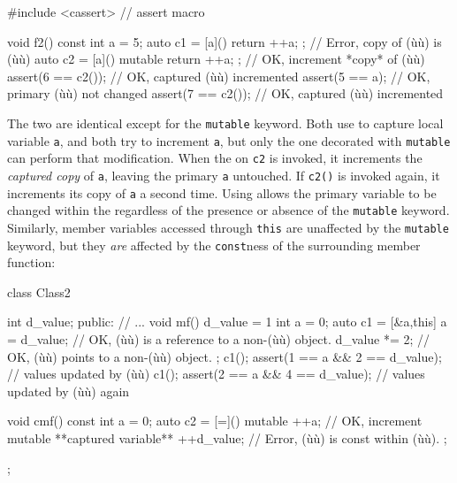 \begin{emcppslisting}
#include <cassert> // assert macro

void f2()
{
    const int a = 5;
    auto c1 = [a]()         { return ++a; };  // Error, copy of (ù{}ù) is (ù{}ù)
    auto c2 = [a]() mutable { return ++a; };  // OK, increment *copy* of (ù{}ù)
    assert(6 == c2());                        // OK, captured (ù{}ù) incremented
    assert(5 == a);                           // OK, primary (ù{}ù) not changed
    assert(7 == c2());                        // OK, captured (ù{}ù) incremented
}
\end{emcppslisting}
    

The two  are identical except for the
\lstinline!mutable! keyword. Both use  to capture
local variable \lstinline!a!, and both try to increment \lstinline!a!, but
only the one decorated with \lstinline!mutable! can perform that
modification. When the  on 
\lstinline!c2! is invoked, it increments the \emph{captured copy} of
\lstinline!a!, leaving the primary \lstinline!a! untouched. If \lstinline!c2()!
is invoked again, it increments its copy of \lstinline!a! a second time.
Using  allows the primary variable to be
changed within the  regardless of the presence or
absence of the \lstinline!mutable! keyword. Similarly, member variables
accessed through \lstinline!this! are unaffected by the \lstinline!mutable!
keyword, but they \emph{are} affected by the \lstinline!const!ness of the
surrounding member function:

\begin{emcppslisting}
class Class2
{
    int d_value;
public:
    // ...
    void mf()
    {
        d_value = 1
        int a = 0;
        auto c1 = [&a,this]{
            a = d_value;   // OK, (ù{}ù) is a reference to a non-(ù{}ù) object.
            d_value *= 2;  // OK, (ù{}ù) points to a non-(ù{}ù) object.
        };
        c1();
        assert(1 == a && 2 == d_value);  // values updated by (ù{}ù)
        c1();
        assert(2 == a && 4 == d_value);  // values updated by (ù{}ù) again
    }

    void cmf() const
    {
        int a = 0;
        auto c2 = [=]() mutable {
            ++a;        // OK, increment mutable **captured variable**
            ++d_value;  // Error, (ù{}ù) is const within (ù{}ù).
        };
    }
};
\end{emcppslisting}
    

